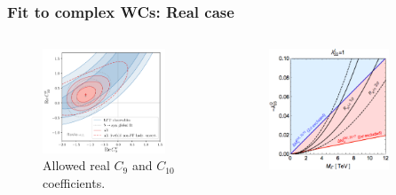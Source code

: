 \documentclass[mathserif, 10pt]{beamer}
\begin{document}
\begin{frame}\frametitle{Fit to complex WCs: Real case}
    \begin{columns}
        \begin{column}[t]{0.48\textwidth}
            \begin{figure}
                \centering
                \includegraphics[width =0.9\textwidth]{figures/contours_cropped.pdf}\\
                \small{Allowed real $C_9$ and $C_{10}$ \\coefficients. \protect\footnotemark[7]}
            \end{figure}
        \end{column}
        \begin{column}[t]{0.48\textwidth}
            \begin{figure}
                \centering
                \includegraphics[width =0.8\textwidth]{figures/BsmixvsRK.pdf}\\

\end{figure}
\end{column}
\end{columns}
\end{frame}
\end{document}

